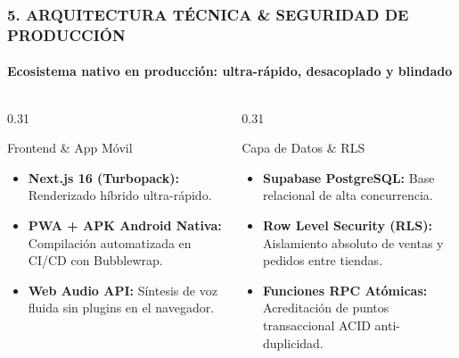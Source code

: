 \documentclass[aspectratio=169, 10pt]{beamer}
\begin{document}
\begin{frame}
  \frametitle{5. ARQUITECTURA TÉCNICA \& SEGURIDAD DE PRODUCCIÓN}
  \framesubtitle{Ecosistema nativo en producción: ultra-rápido, desacoplado y blindado}

  \begin{columns}[T]
    \begin{column}{0.31\textwidth}
      \begin{alertblock}{Frontend \& App Móvil}
        \scriptsize
        \begin{itemize}\setlength\itemsep{0.25em}
          \item \textbf{Next.js 16 (Turbopack):} Renderizado híbrido ultra-rápido.
          \item \textbf{PWA + APK Android Nativa:} Compilación automatizada en CI/CD con Bubblewrap.
          \item \textbf{Web Audio API:} Síntesis de voz fluida sin plugins en el navegador.
        \end{itemize}
      \end{alertblock}
    \end{column}

    \begin{column}{0.31\textwidth}
      \begin{block}{Capa de Datos \& RLS}
        \scriptsize
        \begin{itemize}\setlength\itemsep{0.25em}
          \item \textbf{Supabase PostgreSQL:} Base relacional de alta concurrencia.
          \item \textbf{Row Level Security (RLS):} Aislamiento absoluto de ventas y pedidos entre tiendas.
          \item \textbf{Funciones RPC Atómicas:} Acreditación de puntos transaccional ACID anti-duplicidad.
        \end{itemize}
      \end{block}
    \end{column}


\end{columns}
\end{frame}
\end{document}
